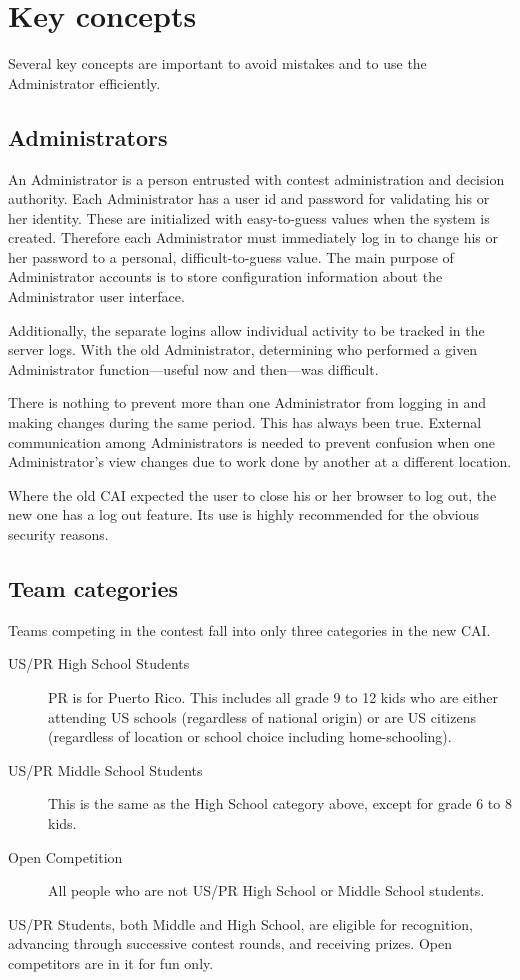 \documentclass[11pt,letterpaper]{refart}
\begin{document}
\section{Key concepts}
Several key concepts are important to avoid mistakes and to use the Administrator
efficiently.

\subsection{Administrators}
An Administrator is a person entrusted with contest administration and decision authority.  
Each Administrator has a user id and password for validating his or her identity. These 
are initialized with easy-to-guess values when the system is 
created. Therefore each Administrator must immediately log in to change his or her password 
to a personal, difficult-to-guess value. The main purpose of Administrator accounts is to
store configuration information about the Administrator user interface.  

Additionally, the separate logins allow individual activity to be tracked in the server logs.  
With the old Administrator, determining who performed a given Administrator 
function---useful now and then---was difficult.

There is nothing to prevent more than one Administrator from logging in 
and making changes during the same period.  This has always been true.  
External communication among Administrators is needed to prevent
confusion when one Administrator's view changes due to work done by
another at a different location.

Where the old CAI expected the user to close his or her browser to log out, the
new one has a log out feature. Its use is highly recommended for the obvious
security reasons.

\subsection{Team categories}
Teams competing in the contest fall into only three categories in the new CAI.
\begin{description}
\item[US/PR High School Students]  PR is for Puerto Rico.  This includes all 
grade 9 to 12
kids who are either attending US schools (regardless of national origin) or are
US citizens (regardless of location or school choice including home-schooling).
\item[US/PR Middle School Students]  This is the same as the High School
category above, except for grade 6 to 8 kids.
\item[Open Competition]  All people who are not US/PR High School
or Middle School students.
\end{description}
US/PR Students, both Middle and High School, are eligible for recognition, 
advancing through successive
contest rounds, and receiving prizes.  Open competitors are in it for fun only.
\end{document}
